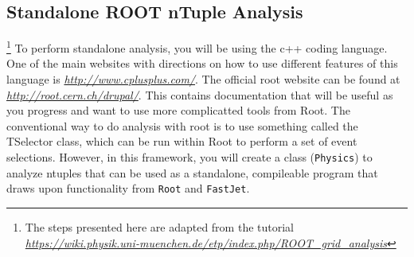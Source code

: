 \documentclass[12pt]{article}
\begin{document}
\subsection{Standalone ROOT nTuple Analysis}
\footnote{The steps presented here are adapted from the tutorial \href{https://wiki.physik.uni-muenchen.de/etp/index.php/ROOT_grid_analysis}{\textit{https://wiki.physik.uni-muenchen.de/etp/index.php/ROOT\_grid\_analysis}} }
To perform standalone analysis, you will be using the c++ coding language.  One of the main websites with directions on how to use different features of this language is \href{http://www.cplusplus.com/}{\textit{http://www.cplusplus.com/}}.  The official root website can be found at \href{http://root.cern.ch/drupal/}{\textit{http://root.cern.ch/drupal/}}.  This contains documentation that will be useful as you progress and want to use more complicatted tools from Root.  The conventional way to do analysis with root is to use something called the TSelector class, which can be run within Root to perform a set of event selections.  However, in this framework, you will create a class (\texttt{Physics}) to analyze ntuples that can be used as a standalone, compileable program that draws upon functionality from \texttt{Root} and \texttt{FastJet}.
\end{document}
